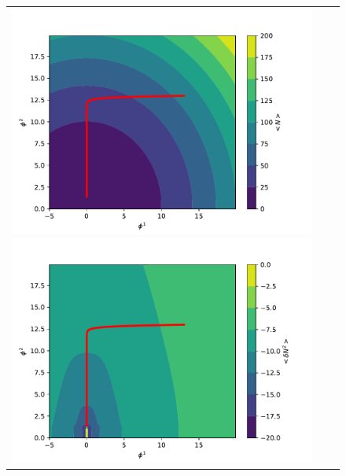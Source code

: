 \documentclass[aps, prd
, preprint
, nofootinbib 
, notitlepage
, superscriptaddress
, longbibliography
]{revtex4-1}
\begin{document}
\begin{figure}
	\centering
	\begin{tabular}{ccc}
		\begin{minipage}{0.33\hsize}
			\centering
			\includegraphics[width=\hsize]{figs/N_double_chaotic_SR.pdf}
		\end{minipage}
		\begin{minipage}{0.33\hsize}
			\centering
			\includegraphics[width=\hsize]{figs/dN2_double_chaotic_SR.pdf}
		\end{minipage}
		\begin{minipage}{0.33\hsize}
			\centering

\end{minipage}
\end{tabular}
\end{figure}
\end{document}

